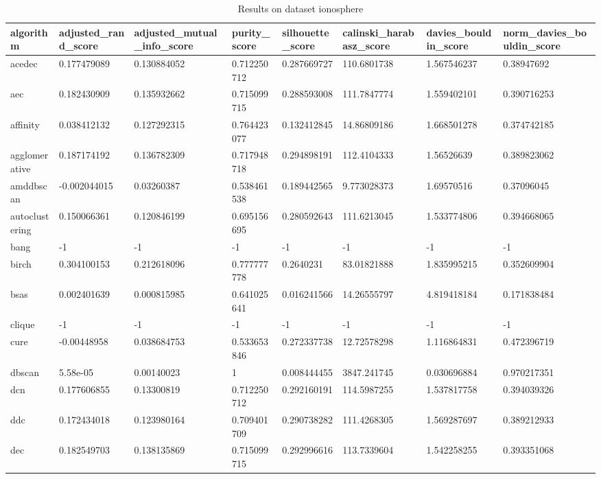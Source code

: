 \begin{table}[H]
\centering
\caption{Results on dataset ionosphere}
\label{tab:params:ionosphere}
\begin{tabular}{|l|l|l|l|l|l|l|l|}
\hline
algorithm & adjusted\_rand\_score & adjusted\_mutual\_info\_score & purity\_score & silhouette\_score & calinski\_harabasz\_score & davies\_bouldin\_score & norm\_davies\_bouldin\_score \\
\hline
acedec & 0.177479089 & 0.130884052 & 0.712250712 & 0.287669727 & 110.6801738 & 1.567546237 & 0.38947692 \\
\hline
aec & 0.182430909 & 0.135932662 & 0.715099715 & 0.288593008 & 111.7847774 & 1.559402101 & 0.390716253 \\
\hline
affinity & 0.038412132 & 0.127292315 & 0.764423077 & 0.132412845 & 14.86809186 & 1.668501278 & 0.374742185 \\
\hline
agglomerative & 0.187174192 & 0.136782309 & 0.717948718 & 0.294898191 & 112.4104333 & 1.56526639 & 0.389823062 \\
\hline
amddbscan & -0.002044015 & 0.03260387 & 0.538461538 & 0.189442565 & 9.773028373 & 1.69570516 & 0.37096045 \\
\hline
autoclustering & 0.150066361 & 0.120846199 & 0.695156695 & 0.280592643 & 111.6213045 & 1.533774806 & 0.394668065 \\
\hline
bang & -1 & -1 & -1 & -1 & -1 & -1 & -1 \\
\hline
birch & 0.304100153 & 0.212618096 & 0.777777778 & 0.2640231 & 83.01821888 & 1.835995215 & 0.352609904 \\
\hline
bsas & 0.002401639 & 0.000815985 & 0.641025641 & 0.016241566 & 14.26555797 & 4.819418184 & 0.171838484 \\
\hline
clique & -1 & -1 & -1 & -1 & -1 & -1 & -1 \\
\hline
cure & -0.00448958 & 0.038684753 & 0.533653846 & 0.272337738 & 12.72578298 & 1.116864831 & 0.472396719 \\
\hline
dbscan & 5.58e-05 & 0.00140023 & 1 & 0.008444455 & 3847.241745 & 0.030696884 & 0.970217351 \\
\hline
dcn & 0.177606855 & 0.13300819 & 0.712250712 & 0.292160191 & 114.5987255 & 1.537817758 & 0.394039326 \\
\hline
ddc & 0.172434018 & 0.123980164 & 0.709401709 & 0.290738282 & 111.4268305 & 1.569287697 & 0.389212933 \\
\hline
dec & 0.182549703 & 0.138135869 & 0.715099715 & 0.292996616 & 113.7339604 & 1.542258255 & 0.393351068 \\

\end{tabular}
\end{table}
